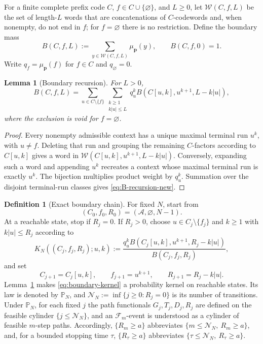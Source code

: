 \documentclass[journal]{IEEEtran}
\theoremstyle{plain}
\newtheorem{lemma}[theorem]{Lemma}
\theoremstyle{definition}
\newtheorem{definition}[theorem]{Definition}
\theoremstyle{remark}
\newcommand{\A}{\mathcal A}
\newcommand{\F}{\mathcal F}
\newcommand{\Wcal}{\mathscr W}
\newcommand{\Pbound}{\mathbb P_N}
\newcommand{\muP}{\mu_{\mathbf p}}
\begin{document}
For a finite complete prefix code $C$, $f\in C\cup\{\varnothing\}$, and $L\ge0$, let $\Wcal(C,f,L)$ be the set of length-$L$ words that are concatenations of $C$-codewords and, when nonempty, do not end in $f$; for $f=\varnothing$ there is no restriction.  Define the boundary mass
\begin{equation}\label{eq:B-def}
 B(C,f,L):=\sum_{y\in\Wcal(C,f,L)}\muP(y),
 \qquad B(C,f,0)=1.
\end{equation}
Write $q_f=\muP(f)$ for $f\in C$ and $q_\varnothing=0$.

\begin{lemma}[Boundary recursion]\label{lem:boundary-recursion}
For $L>0$,
\begin{equation}\label{eq:B-recursion-new}
 B(C,f,L)=\sum_{u\in C\setminus\{f\}}
 \sum_{\substack{k\ge1\\k|u|\le L}}
 q_u^k B(C[u,k],u^{k+1},L-k|u|),
\end{equation}
where the exclusion is void for $f=\varnothing$.
\end{lemma}

\begin{proof}
Every nonempty admissible context has a unique maximal terminal run $u^k$, with $u\ne f$.  Deleting that run and grouping the remaining $C$-factors according to $C[u,k]$ gives a word in $\Wcal(C[u,k],u^{k+1},L-k|u|)$.  Conversely, expanding such a word and appending $u^k$ recreates a context whose maximal terminal run is exactly $u^k$.  The bijection multiplies product weight by $q_u^k$.  Summation over the disjoint terminal-run classes gives \eqref{eq:B-recursion-new}.
\end{proof}

\begin{definition}[Exact boundary chain]\label{def:boundary-chain}
For fixed $N$, start from
\begin{equation*}
 (C_0,f_0,R_0)=(\A,\varnothing,N-1).
\end{equation*}
At a reachable state, stop if $R_j=0$.  If $R_j>0$, choose $u\in C_j\setminus\{f_j\}$ and $k\ge1$ with $k|u|\le R_j$ according to
\begin{equation}\label{eq:boundary-kernel}
 K_N((C_j,f_j,R_j);u,k)
 :=\frac{q_u^k B(C_j[u,k],u^{k+1},R_j-k|u|)}
 {B(C_j,f_j,R_j)},
\end{equation}
and set
\begin{equation}\label{eq:boundary-update}
 C_{j+1}=C_j[u,k],
 \qquad
 f_{j+1}=u^{k+1},
 \qquad
 R_{j+1}=R_j-k|u|.
\end{equation}
Lemma~\ref{lem:boundary-recursion} makes \eqref{eq:boundary-kernel} a probability kernel on reachable states.  Its law is denoted by $\Pbound$, and $\mathcal N_N:=\inf\{j\ge0:R_j=0\}$ is its number of transitions.  Under $\Pbound$, for each fixed $j$ the path functionals $G_j,T_j,D_j,R_j$ are defined on the feasible cylinder $\{j\le\mathcal N_N\}$, and an $\F_m$-event is understood as a cylinder of feasible $m$-step paths.  Accordingly, $\{R_m\ge a\}$ abbreviates $\{m\le\mathcal N_N,\ R_m\ge a\}$, and, for a bounded stopping time $\tau$, $\{R_\tau\ge a\}$ abbreviates $\{\tau\le\mathcal N_N,\ R_\tau\ge a\}$.
\end{definition}
\end{document}
